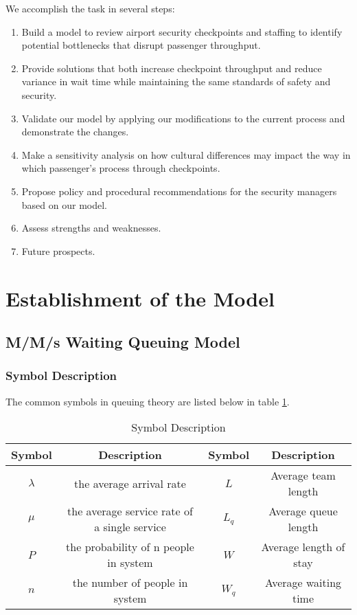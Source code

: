 \documentclass{mcmthesis}
\begin{document}
\par We accomplish the task in several steps:
\begin{enumerate}[step 1:]
\item Build a model to review airport security checkpoints and staffing to identify potential bottlenecks that disrupt passenger throughput.
\item Provide solutions that both increase checkpoint throughput and reduce variance in wait time while maintaining the same standards of safety and security.
\item Validate our model by applying our modifications to the current process and demonstrate the changes.
\item Make a sensitivity analysis on how cultural differences may impact the way in which passenger’s process through checkpoints. 
\item Propose policy and procedural recommendations for the security managers based on our model.
\item Assess strengths and weaknesses.
\item Future prospects.
\end{enumerate}


\section{Establishment of the Model}

\subsection{M/M/s Waiting Queuing Model}
\subsubsection*{Symbol Description}
\par The common symbols in queuing theory are listed below in table \ref{tab:Symbol Description}.
\begin{table}[h]
\centering
\caption{Symbol Description}\label{tab:Symbol Description}
\begin{tabular}{cc|cc}
\toprule
Symbol & Description & Symbol & Description\\
\midrule
$\lambda$ & the average arrival rate & $L$ & Average team length \\
$\mu$ & the average service rate of a single service & $L_q$ & Average queue length \\
$P$ & the probability of n people in system & $W$ & Average length of stay\\
$n$ & the number of people in system & $W_q$ & Average waiting time\\
\bottomrule
\end{tabular}
\end{table}
\end{document}
